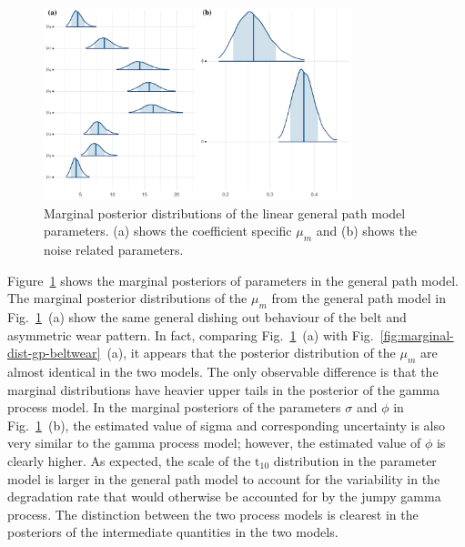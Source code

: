 \begin{figure}
  \centering
  \includegraphics[width=0.8\textwidth]{figures/ch-6/marginal_post_lm.pdf}
  \caption{Marginal posterior distributions of the linear general path model parameters. (a) shows the coefficient specific $\mu_m$ and (b) shows the noise related parameters.}
  \label{fig:marginal-dist-lm-beltwear}
\end{figure}

Figure~\ref{fig:marginal-dist-lm-beltwear} shows the marginal posteriors of parameters in the general path model. The marginal posterior distributions of the $\mu_m$ from the general path model in Fig.~\ref{fig:marginal-dist-lm-beltwear}~(a) show the same general dishing out behaviour of the belt and asymmetric wear pattern. In fact, comparing Fig.~\ref{fig:marginal-dist-lm-beltwear}~(a) with Fig.~\ref{fig:marginal-dist-gp-beltwear}~(a), it appears that the posterior distribution of the $\mu_m$ are almost identical in the two models. The only observable difference is that the marginal distributions have heavier upper tails in the posterior of the gamma process model. In the marginal posteriors of the parameters $\sigma$ and $\phi$ in Fig.~\ref{fig:marginal-dist-lm-beltwear}~(b), the estimated value of sigma and corresponding uncertainty is also very similar to the gamma process model; however, the estimated value of $\phi$ is clearly higher. As expected, the scale of the $\mbox{t}_{10}$ distribution in the parameter model is larger in the general path model to account for the variability in the degradation rate that would otherwise be accounted for by the jumpy gamma process. The distinction between the two process models is clearest in the posteriors of the intermediate quantities in the two models.

